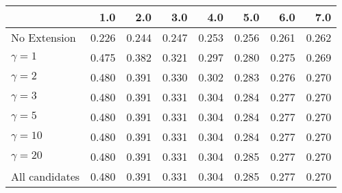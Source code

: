 \begin{tabular}{lrrrrrrr}
\toprule
{} &   1.0 &   2.0 &   3.0 &   4.0 &   5.0 &   6.0 &   7.0 \\
\midrule
No Extension   & 0.226 & 0.244 & 0.247 & 0.253 & 0.256 & 0.261 & 0.262 \\
$\gamma = 1$   & 0.475 & 0.382 & 0.321 & 0.297 & 0.280 & 0.275 & 0.269 \\
$\gamma = 2$   & 0.480 & 0.391 & 0.330 & 0.302 & 0.283 & 0.276 & 0.270 \\
$\gamma = 3$   & 0.480 & 0.391 & 0.331 & 0.304 & 0.284 & 0.277 & 0.270 \\
$\gamma = 5$   & 0.480 & 0.391 & 0.331 & 0.304 & 0.284 & 0.277 & 0.270 \\
$\gamma = 10$  & 0.480 & 0.391 & 0.331 & 0.304 & 0.284 & 0.277 & 0.270 \\
$\gamma = 20$  & 0.480 & 0.391 & 0.331 & 0.304 & 0.285 & 0.277 & 0.270 \\
All candidates & 0.480 & 0.391 & 0.331 & 0.304 & 0.285 & 0.277 & 0.270 \\
\bottomrule
\end{tabular}
